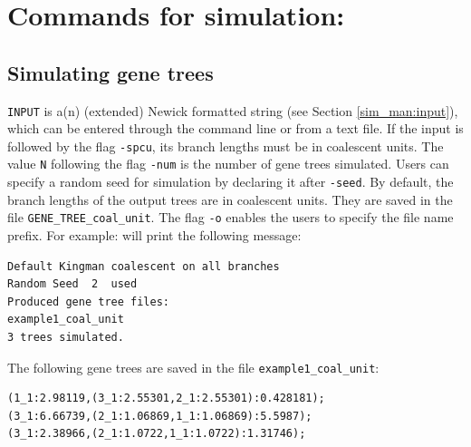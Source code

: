 \section{Commands for simulation:}
\subsection{Simulating gene trees}

{\tt INPUT} is a(n) (extended) Newick formatted string (see Section \ref{sim_man:input}), which can be entered through the command line or from a text file.
If the input is followed by the flag {\tt -spcu}, its branch lengths must be in coalescent units.
The value {\tt N} following the flag {\tt -num} is the number of gene trees simulated.
Users can specify a random seed for simulation by declaring it after {\tt -seed}.
By default, the branch lengths of the output trees are in coalescent units. They are saved in the file {\tt GENE\_TREE\_coal\_unit}. The flag {\tt -o} enables the users to specify the file name prefix. For example:
will print the following message:
\begin{verbatim}
Default Kingman coalescent on all branches
Random Seed  2  used
Produced gene tree files:
example1_coal_unit
3 trees simulated.
\end{verbatim}
The following gene trees are saved in the file {\tt example1\_coal\_unit}:
\begin{verbatim}
(1_1:2.98119,(3_1:2.55301,2_1:2.55301):0.428181);
(3_1:6.66739,(2_1:1.06869,1_1:1.06869):5.5987);
(3_1:2.38966,(2_1:1.0722,1_1:1.0722):1.31746);
\end{verbatim}

